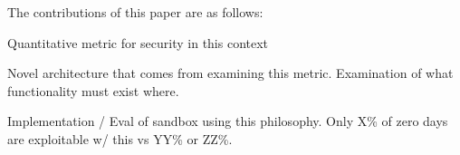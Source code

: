 The contributions of this paper are as follows:

Quantitative metric for security in this context

Novel architecture that comes from examining this metric.  Examination of
what functionality must exist where.

Implementation / Eval of sandbox using this philosophy.  
Only X\% of zero days are exploitable w/ this vs YY\% or ZZ\%.



